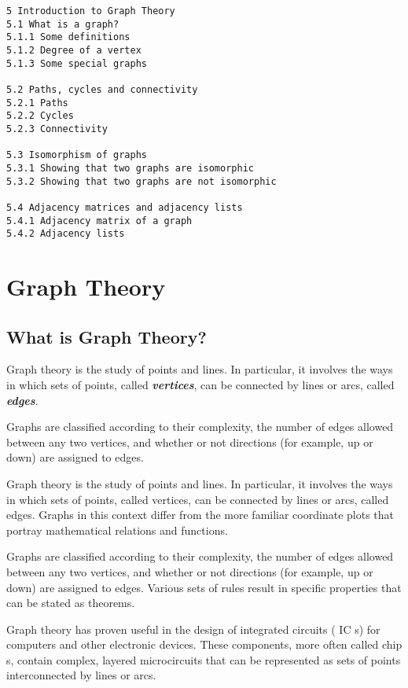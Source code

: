 \documentclass[]{report}
\begin{document}
\begin{verbatim}
5 Introduction to Graph Theory 
5.1 What is a graph?
5.1.1 Some definitions  
5.1.2 Degree of a vertex 
5.1.3 Some special graphs  

5.2 Paths, cycles and connectivity  
5.2.1 Paths 
5.2.2 Cycles  
5.2.3 Connectivity  

5.3 Isomorphism of graphs  
5.3.1 Showing that two graphs are isomorphic 
5.3.2 Showing that two graphs are not isomorphic
 
5.4 Adjacency matrices and adjacency lists  
5.4.1 Adjacency matrix of a graph 
5.4.2 Adjacency lists 

\end{verbatim}
\newpage
\section*{Graph Theory}
\subsection*{What is Graph Theory?}

Graph theory is the study of points and lines. In particular, it involves the ways in which sets of points, called \textit{\textbf{vertices}}, can be connected by lines or arcs, called \textit{\textbf{edges}}.

Graphs are classified according to their complexity, the number of edges allowed between any two vertices, and whether or not directions (for example, up or down) are assigned to edges. 

Graph theory is the study of points and lines. In particular, it involves the ways in which sets of points, called vertices, can be connected by lines or arcs, called edges. Graphs in this context differ from the more familiar coordinate plots that portray mathematical relations and functions.

Graphs are classified according to their complexity, the number of edges allowed between any two vertices, and whether or not directions (for example, up or down) are assigned to edges. Various sets of rules result in specific properties that can be stated as theorems.

Graph theory has proven useful in the design of integrated circuits ( IC s) for computers and other electronic devices. These components, more often called chip s, contain complex, layered microcircuits that can be represented as sets of points interconnected by lines or arcs. 
\end{document}
